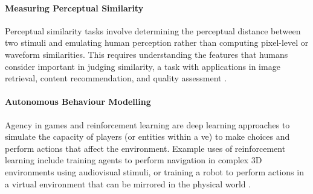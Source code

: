 \paragraph{Measuring Perceptual Similarity}
Perceptual similarity tasks involve determining the perceptual distance between two stimuli and emulating human perception rather than computing pixel-level or waveform similarities. This requires understanding the features that humans consider important in judging similarity, a task with applications in image retrieval, content recommendation, and quality assessment \citep{Dolhasz_2020_CVPR}.\par
\paragraph{Autonomous Behaviour Modelling}
Agency in games and reinforcement learning are deep learning approaches to simulate the capacity of players (or entities within a \acrshort{ve}) to make choices and perform actions that affect the environment. Example uses of reinforcement learning include training agents to perform navigation in complex 3D environments using audiovisual stimuli, or training a robot to perform actions in a virtual environment that can be mirrored in the physical world \citep{yannakakis2018artificial, matulis2021robot}.

